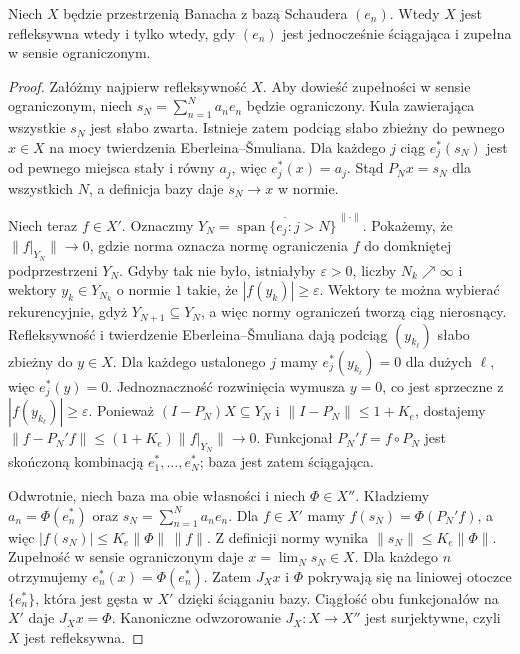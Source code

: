 \begin{twierdzenie}
\label{thm:james-basis27}
Niech $X$ będzie przestrzenią Banacha z bazą Schaudera $(e_n)$.
Wtedy $X$ jest refleksywna wtedy i tylko wtedy, gdy
$(e_n)$ jest jednocześnie ściągająca i zupełna w sensie
ograniczonym.
\end{twierdzenie}
\begin{proof}
Załóżmy najpierw refleksywność $X$.
Aby dowieść zupełności w sensie ograniczonym,
niech $s_N=\sum_{n=1}^Na_ne_n$ będzie ograniczony.
Kula zawierająca wszystkie $s_N$ jest słabo zwarta.
Istnieje zatem podciąg słabo zbieżny do pewnego $x\in X$
na mocy twierdzenia Eberleina--\v Smuliana.
Dla każdego $j$ ciąg $e_j^*(s_N)$ jest od pewnego miejsca
stały i równy $a_j$, więc $e_j^*(x)=a_j$.
Stąd $P_Nx=s_N$ dla wszystkich $N$, a definicja bazy
daje $s_N\to x$ w normie.

Niech teraz $f\in X'$. Oznaczmy
$Y_N=\overline{\operatorname{span}\{e_j:j>N\}}^{\,\|\cdot\|}$.
Pokażemy, że $\|f|_{Y_N}\|\to0$, gdzie norma oznacza
normę ograniczenia $f$ do domkniętej podprzestrzeni $Y_N$.
Gdyby tak nie było, istniałyby $\varepsilon>0$, liczby
$N_k\nearrow\infty$ i wektory $y_k\in Y_{N_k}$
o normie $1$ takie, że $|f(y_k)|\ge\varepsilon$.
Wektory te można wybierać rekurencyjnie, gdyż $Y_{N+1}\subseteq Y_N$,
a więc normy ograniczeń tworzą ciąg nierosnący.
Refleksywność i twierdzenie Eberleina--\v Smuliana
dają podciąg $(y_{k_\ell})$ słabo zbieżny do $y\in X$.
Dla każdego ustalonego $j$ mamy
$e_j^*(y_{k_\ell})=0$ dla dużych $\ell$, więc $e_j^*(y)=0$.
Jednoznaczność rozwinięcia wymusza $y=0$,
co jest sprzeczne z $|f(y_{k_\ell})|\ge\varepsilon$.
Ponieważ $(I-P_N)X\subseteq Y_N$ i $\|I-P_N\|\le1+K_e$,
dostajemy $\|f-P_N'f\|\le(1+K_e)\|f|_{Y_N}\|\to0$.
Funkcjonał $P_N'f=f\circ P_N$ jest skończoną kombinacją
$e_1^*,\ldots,e_N^*$; baza jest zatem ściągająca.

Odwrotnie, niech baza ma obie własności i niech
$\Phi\in X''$. Kładziemy $a_n=\Phi(e_n^*)$ oraz
$s_N=\sum_{n=1}^Na_ne_n$. Dla $f\in X'$ mamy
$f(s_N)=\Phi(P_N'f)$, a więc
$|f(s_N)|\le K_e\|\Phi\|\,\|f\|$.
Z definicji normy wynika $\|s_N\|\le K_e\|\Phi\|$.
Zupełność w sensie ograniczonym daje
$x=\lim_Ns_N\in X$. Dla każdego $n$ otrzymujemy
$e_n^*(x)=\Phi(e_n^*)$.
Zatem $J_Xx$ i $\Phi$ pokrywają się na liniowej otoczce
$\{e_n^*\}$, która jest gęsta w $X'$ dzięki ściąganiu bazy.
Ciągłość obu funkcjonałów na $X'$ daje $J_Xx=\Phi$.
Kanoniczne odwzorowanie $J_X:X\to X''$ jest surjektywne,
czyli $X$ jest refleksywna.
\end{proof}

